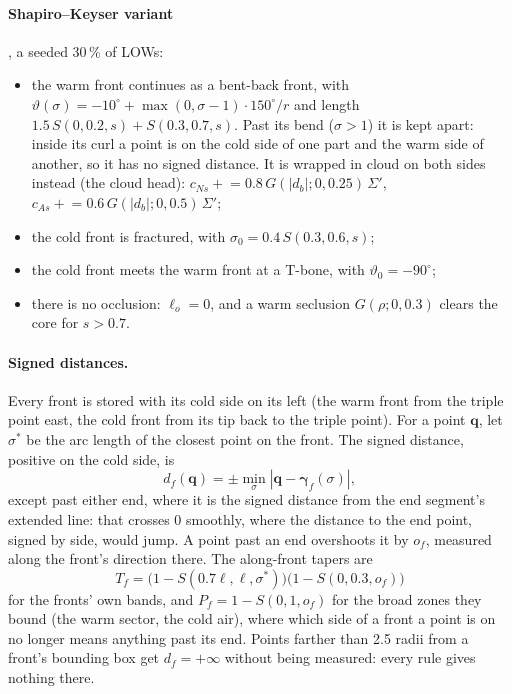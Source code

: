\documentclass[11pt,a4paper]{article}
\begin{document}
\paragraph{Shapiro--Keyser variant} \cite{shapiro1990}, a seeded 30\,\% of LOWs:
\begin{itemize}
\item the warm front continues as a bent-back front, with
  $\vartheta(\sigma)=-10^\circ+\max(0,\sigma-1)\cdot150^\circ\!/r$ and length
  $1.5\,S(0,0.2,s)+S(0.3,0.7,s)$. Past its bend ($\sigma>1$) it is kept apart: inside its
  curl a point is on the cold side of one part and the warm side of another, so it has no
  signed distance. It is wrapped in cloud on both sides instead (the cloud head):
  $c_{Ns}\mathrel{+}=0.8\,G(|d_b|;0,0.25)\,\Sigma'$, $c_{As}\mathrel{+}=0.6\,G(|d_b|;0,0.5)\,\Sigma'$;
\item the cold front is fractured, with $\sigma_0=0.4\,S(0.3,0.6,s)$;
\item the cold front meets the warm front at a T-bone, with $\vartheta_0=-90^\circ$;
\item there is no occlusion: $\ell_o=0$, and a warm seclusion $G(\rho;0,0.3)$ clears the core
  for $s>0.7$.
\end{itemize}

\paragraph{Signed distances.}
Every front is stored with its cold side on its left (the warm front from the triple point east,
the cold front from its tip back to the triple point). For a point $\mathbf{q}$, let $\sigma^*$
be the arc length of the closest point on the front. The signed distance, positive on the cold
side, is
\begin{equation}
  d_f(\mathbf{q})=\pm\min_{\sigma}|\mathbf{q}-\boldsymbol{\gamma}_f(\sigma)|,
\end{equation}
except past either end, where it is the signed distance from the end segment's extended line:
that crosses 0 smoothly, where the distance to the end point, signed by side, would jump. A
point past an end overshoots it by $o_f$, measured along the front's direction there. The
along-front tapers are
\begin{equation}
  T_f=\big(1-S(0.7\ell,\ell,\sigma^*)\big)\big(1-S(0,0.3,o_f)\big)
\end{equation}
for the fronts' own bands, and $P_f=1-S(0,1,o_f)$ for the broad zones they bound (the warm
sector, the cold air), where which side of a front a point is on no longer means anything
past its end. Points farther than 2.5 radii from a front's bounding box get $d_f=+\infty$
without being measured: every rule gives nothing there.
\end{document}
